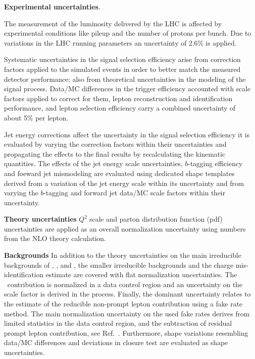 \textbf{Experimental uncertainties}.

\bit
\item {} The measurement of the luminosity delivered by the LHC is affected by experimental conditions like pileup and the number of protons per bunch. Due to variations in the LHC running parameters an uncertainty of 2.6\% is applied.

\item {} Systematic uncertainties in the signal selection efficiency arise from correction factors applied to the simulated events in order to better match the measured detector performance; also from theoretical uncertainties in the modeling of the signal process. Data/MC differences in the trigger efficiency accounted with scale factors applied to correct for them, lepton reconstruction and identification performance, and lepton selection efficiency carry a combined uncertainty of about 5\% per lepton.

\item {} Jet energy corrections affect the uncertainty in the signal selection efficiency it is evaluated by varying the correction factors within their uncertainties and propagating the effects to the final results by recalculating the kinematic quantities. The effects of the jet energy scale uncertainties, $b$-tagging efficiency and foeward jet mismodeling are evaluated using dedicated shape templates derived from a variation of the jet energy scale within its uncertainty and from varying the $b$-tagging and forward jet data/MC scale factors within their uncertainty. 
\eit



















\textbf{Theory uncertainties}
$Q^2$ scale and parton distribution function (pdf) uncertainties are applied as an overall normalization uncertainty using numbers from the NLO theory calculation.

\textbf{Backgrounds}
In addition to the theory uncertainties on the main irreducible backgrounds of \ttW, \ttZ, and \ttH, the smaller irreducible backgrounds and the charge mis-identification estimate are covered with flat normalization uncertainties.
The \WZ\ contribution is normalized in a data control region and an uncertainty on the scale factor is derived in the process.
Finally, the dominant uncertainty relates to the estimate of the reducible non-prompt lepton contribution using a fake rate method.
The main normalization uncertainty on the used fake rates derives from limited statistics in the data control region, and the subtraction of residual prompt lepton contribution, see Ref.~\cite{CMS_AN_2017-029}.
Furthermore, shape variations resembling data/MC differences and deviations in closure test are evaluated as shape uncertainties.










